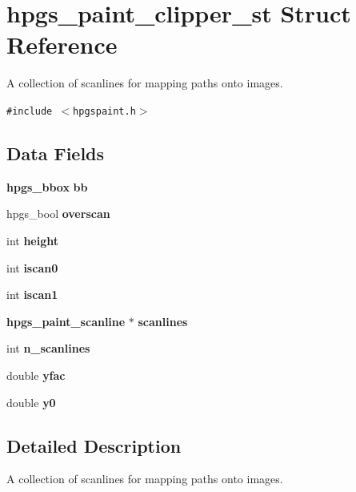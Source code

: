 \section{hpgs\_\-paint\_\-clipper\_\-st Struct Reference}
\label{structhpgs__paint__clipper__st}
A collection of scanlines for mapping paths onto images.  


{\tt \#include $<$hpgspaint.h$>$}

\subsection*{Data Fields}
\begin{CompactItemize}
\item 
{\bf hpgs\_\-bbox} \textbf{bb}\label{structhpgs__paint__clipper__st_99e473a73883b3dc7f878011ccc78a29}

\item 
hpgs\_\-bool {\bf overscan}
\item 
int {\bf height}
\item 
int {\bf iscan0}
\item 
int {\bf iscan1}
\end{CompactItemize}
\begin{Indent}{\bf }\par
\begin{CompactItemize}
\item 
{\bf hpgs\_\-paint\_\-scanline} $\ast$ {\bf scanlines}
\item 
int \textbf{n\_\-scanlines}\label{structhpgs__paint__clipper__st_367b1a282fe5383aa5f263180c804fcc}

\end{CompactItemize}
\end{Indent}
\begin{Indent}{\bf }\par
\begin{CompactItemize}
\item 
double {\bf yfac}
\item 
double \textbf{y0}\label{structhpgs__paint__clipper__st_40c3cba1b7385c968894c9c22eb914cb}

\end{CompactItemize}
\end{Indent}


\subsection{Detailed Description}
A collection of scanlines for mapping paths onto images. 

